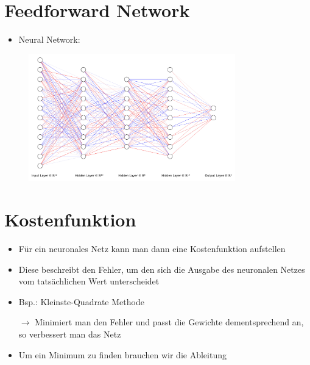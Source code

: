 \documentclass[t]{beamer}
\begin{document}
\section{Feedforward Network}
\begin{frame}
    \begin{itemize}
        \item Neural Network:
    \end{itemize}
    \begin{figure}
        \centering
        \includegraphics[width=0.8\textwidth]{./images/example-nn-crop.pdf}
    \end{figure}
\end{frame}

\section{Kostenfunktion}
\begin{frame}
    \begin{itemize}
        \item Für ein neuronales Netz kann man dann eine Kostenfunktion aufstellen
        \item Diese beschreibt den Fehler, um den sich die Ausgabe des neuronalen Netzes vom tatsächlichen Wert unterscheidet \newline
        \item Bsp.: Kleinste-Quadrate Methode \newline
        \item[\(\rightarrow\)] Minimiert man den Fehler und passt die Gewichte dementsprechend an, so verbessert man das Netz \newline
        \item Um ein Minimum zu finden brauchen wir die Ableitung
    \end{itemize}
\end{frame}
\end{document}
